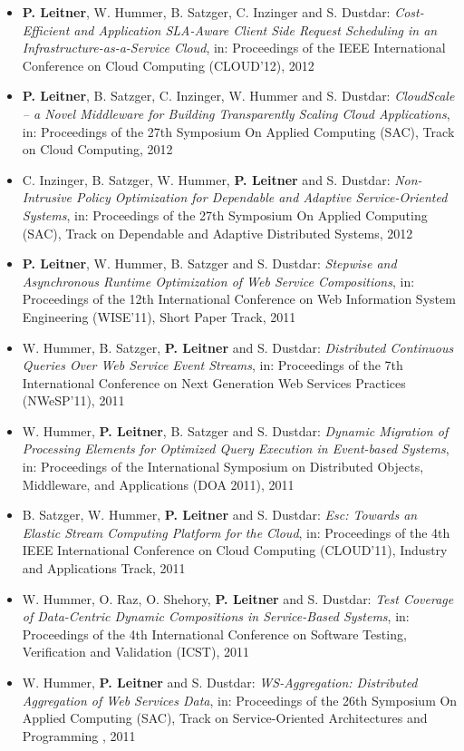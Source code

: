 \documentclass[paper=letter,fontsize=11pt]{scrartcl} %
\begin{document}
\begin{itemize}
\begin{shaded}
  \end{shaded}
\item \textbf{P. Leitner}, W. Hummer, B. Satzger, C. Inzinger and S. Dustdar:
\emph{Cost-Efficient and Application SLA-Aware Client Side Request Scheduling in an Infrastructure-as-a-Service Cloud}, in: Proceedings of the IEEE International Conference on Cloud Computing (CLOUD'12), 2012
\item \textbf{P. Leitner}, B. Satzger, C. Inzinger, W. Hummer and S. Dustdar:
\emph{CloudScale -- a Novel Middleware for Building Transparently Scaling
Cloud Applications}, in: Proceedings of the 27th Symposium On Applied Computing (SAC),
Track on Cloud Computing, 2012
\item C. Inzinger, B. Satzger, W. Hummer, \textbf{P. Leitner} and S. Dustdar:
\emph{Non-Intrusive Policy Optimization for Dependable and Adaptive Service-Oriented Systems}, in: Proceedings of the 27th Symposium On Applied Computing (SAC),
Track on Dependable and Adaptive Distributed Systems, 2012
\item \textbf{P. Leitner}, W. Hummer, B. Satzger and S. Dustdar:
\emph{Stepwise and Asynchronous Runtime Optimization of Web Service
Compositions}, in: Proceedings of the 12th International Conference on Web
Information System Engineering (WISE'11), Short Paper Track, 2011
\item W. Hummer, B. Satzger, \textbf{P. Leitner} and S. Dustdar:
\emph{Distributed Continuous Queries Over Web Service Event Streams}, in: Proceedings of the 7th International Conference on Next Generation Web Services Practices
(NWeSP'11), 2011
\item W. Hummer, \textbf{P. Leitner}, B. Satzger and S. Dustdar:
\emph{Dynamic Migration of Processing Elements for Optimized Query Execution in
Event-based Systems}, in: Proceedings of the International Symposium on Distributed
Objects, Middleware, and Applications (DOA 2011), 2011
\item B. Satzger, W. Hummer, \textbf{P. Leitner} and S. Dustdar:
\emph{Esc: Towards an Elastic Stream Computing Platform for the Cloud},
in: Proceedings of the 4th IEEE International Conference on Cloud Computing (CLOUD'11), Industry and Applications Track, 2011
\item W. Hummer, O. Raz, O. Shehory, \textbf{P. Leitner} and S. Dustdar:
\emph{Test Coverage of Data-Centric Dynamic Compositions in Service-Based
Systems}, in: Proceedings of the 4th International Conference on Software Testing,
Verification and Validation (ICST), 2011
\item W. Hummer, \textbf{P. Leitner} and S. Dustdar: \emph{WS-Aggregation: Distributed Aggregation of Web Services Data}, in: Proceedings of the 26th Symposium On Applied Computing (SAC), Track on Service-Oriented Architectures and Programming , 2011

\end{itemize}
\end{document}
